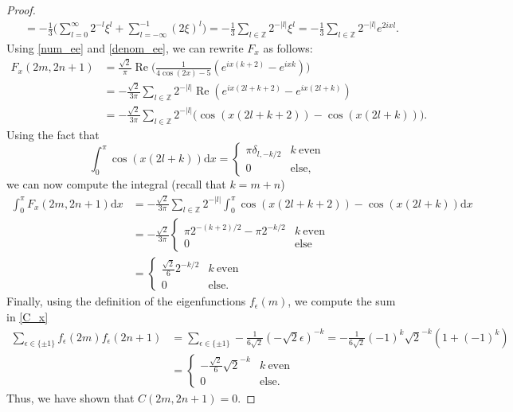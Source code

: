 \documentclass[10pt,a4paper]{amsart}
\newcommand{\Z}{\mathbb{Z}}
\begin{document}
\begin{proof}
\begin{align}
&=-\frac{1}{3}\Big(\sum_{l=0}^{\infty}2^{-l}\xi^l + \sum_{l=-\infty}^{-1} (2\xi)^l \Big) 
=-\frac{1}{3} \sum_{l\in\Z}2^{-|l|}\xi^l=-\frac{1}{3} \sum_{l\in\Z}2^{-|l|}e^{2ixl}. \label{denom_ee}
\end{align}
Using \eqref{num_ee} and \eqref{denom_ee}, we can rewrite $F_x$ as follows:
\begin{align*}
 F_x(2m,2n+1)
 &=\frac{\sqrt{2}}{\pi} \operatorname{Re}\Big(\frac{1}{4\cos(2x)-5}(e^{ix(k+2)}-e^{ixk})\Big) \\
 &=-\frac{\sqrt{2}}{3\pi} \sum_{l\in\Z}2^{-|l|} \operatorname{Re}(e^{ix(2l+k+2)}-e^{ix(2l+k)}) \\
 &=-\frac{\sqrt{2}}{3\pi} \sum_{l\in\Z}2^{-|l|} \big( \cos(x(2l+k+2))-\cos(x(2l+k)) \big).
\end{align*}
Using the fact that 
$$
\int_0^\pi \cos(x(2l+k)) \mathrm{d}x =
\begin{cases}
\pi \delta_{l,-k/2} & k \ \text{even} \\
0 & \text{else},
\end{cases}
$$
we can now compute the integral (recall that $k=m+n$)
\begin{align*}
 \int_0^\pi F_x(2m,2n+1) \mathrm{d}x & =-\frac{\sqrt{2}}{3\pi} \sum_{l\in\Z}2^{-|l|} \int_0^\pi \cos(x(2l+k+2))-\cos(x(2l+k)) \mathrm{d}x \\
 &= -\frac{\sqrt{2}}{3\pi}
\begin{cases}
 \pi 2^{-(k+2)/2} - \pi 2^{-k/2} & k \ \text{even} \\
 0 & \text{else}
\end{cases}
\\
&= 
\begin{cases}
\frac{\sqrt{2}}{6} 2^{-k/2}  & k \ \text{even} \\
 0 & \text{else}.
 \end{cases}
\end{align*}
Finally, using the definition of the eigenfunctions $f_\epsilon(m)$, we compute the sum in \eqref{C_x}
\begin{align*}
 \sum_{\epsilon\in\{\pm1\}}f_\epsilon(2m)f_\epsilon(2n+1) & =\sum_{\epsilon\in\{\pm1\}}-\frac{1}{6\sqrt{2}}(-\sqrt{2}\epsilon)^{-k}=-\frac{1}{6\sqrt{2}}(-1)^k\sqrt{2}^{-k}(1+(-1)^k) \\
 &=
 \begin{cases}
  -\frac{\sqrt{2}}{6}\sqrt{2}^{-k} & k \ \text{even} \\
 0 & \text{else}.
\end{cases}
\end{align*}
Thus, we have shown that $C(2m,2n+1)= 0$.
\end{proof}
\end{document}
